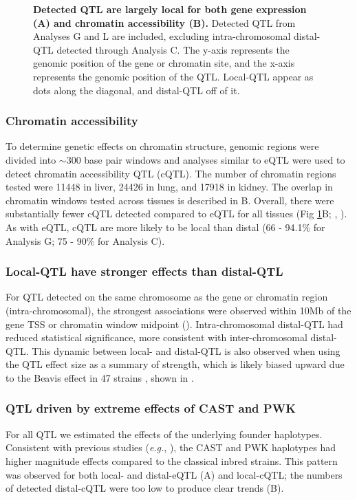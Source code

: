 \documentclass[10pt,letterpaper]{article}
\newcommand{\eg}{\emph{e.g.}\xspace}
\begin{document}
\begin{figure}[h!]
\caption{\textbf{Detected QTL are largely local for both gene expression (A) and chromatin accessibility (B).} 
Detected QTL from Analyses G and L are included, excluding intra-chromosomal distal-QTL detected through Analysis C. The y-axis represents the genomic position of the gene or chromatin site, and the x-axis represents the genomic position of the QTL. Local-QTL appear as dots along the diagonal, and distal-QTL off of it.
\label{fig:grid_plot}}
\end{figure}

\subsubsection*{Chromatin accessibility}
To determine genetic effects on chromatin structure, genomic regions were divided into $\sim$300 base pair windows and analyses similar to eQTL were used to detect chromatin accessibility QTL (cQTL). The number of chromatin regions tested were 11448 in liver, 24426 in lung, and 17918 in kidney. The overlap in chromatin windows tested across tissues is described in B. Overall, there were substantially fewer cQTL detected compared to eQTL for all tissues (Fig \ref{fig:grid_plot}B; , ). As with eQTL, cQTL are more likely to be local than distal (66 - 94.1\% for Analysis G; 75 - 90\% for Analysis C).

\subsubsection*{Local-QTL have stronger effects than distal-QTL}
For QTL detected on the same chromosome as the gene or chromatin region (intra-chromosomal), the strongest associations were observed within 10Mb of the gene TSS or chromatin window midpoint (). Intra-chromosomal distal-QTL had reduced statistical significance, more consistent with inter-chromosomal distal-QTL. This dynamic between local- and distal-QTL is also observed when using the QTL effect size as a summary of strength, which is likely biased upward due to the Beavis effect in 47 strains \cite{Keele2019}, shown in .

\subsubsection*{QTL driven by extreme effects of CAST and PWK}
For all QTL we estimated the effects of the underlying founder haplotypes. Consistent with previous studies (\eg, \cite{Aylor2011}), the CAST and PWK haplotypes had higher magnitude effects compared to the classical inbred strains. This pattern was observed for both local- and distal-eQTL (A) and local-cQTL; the numbers of detected distal-cQTL were too low to produce clear trends (B).
\end{document}
